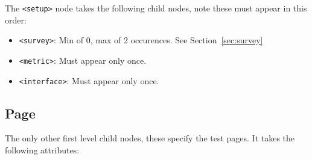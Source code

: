 \documentclass[11pt, oneside]{article}   	%
\begin{document}
        The \texttt{<setup>} node takes the following child nodes, note these must appear in this order:
        \begin{itemize}
            \item \texttt{<survey>}: Min of 0, max of 2 occurences. See Section~\ref{sec:survey}
            \item \texttt{<metric>}: Must appear only once.
            \item \texttt{<interface>}: Must appear only once.
        \end{itemize}

    \subsection{Page}
    \label{sec:page}
        The only other first level child nodes, these specify the test pages. It takes the following attributes:
\end{document}
